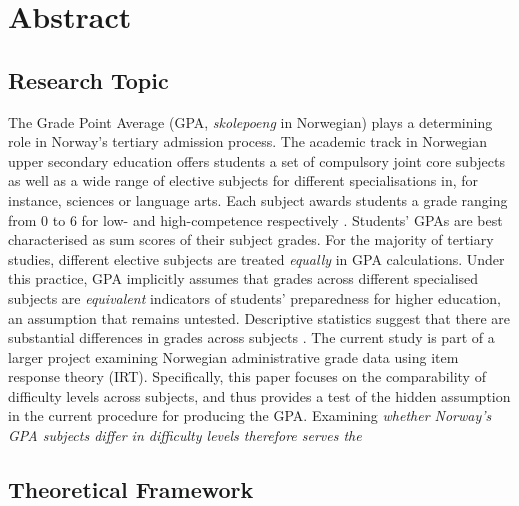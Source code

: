 \section{Abstract}


\subsection{Research Topic}

The Grade Point Average (GPA, \textit{skolepoeng} in Norwegian) plays a determining role in Norway's tertiary admission process. The academic track in Norwegian upper secondary education offers students a set of compulsory joint core subjects as well as a wide range of elective subjects for different specialisations in, for instance, sciences or language arts. Each subject awards students a grade ranging from $0$ to $6$ for low- and high-competence respectively \parencite[][\S 3-5]{lovdata:2006}. Students' GPAs are best characterised as sum scores of their subject grades. For the majority of tertiary studies, different elective subjects are treated \emph{equally} in GPA calculations. Under this practice, GPA implicitly assumes that grades across different specialised subjects are \emph{equivalent} indicators of students' preparedness for higher education, an assumption that remains untested. Descriptive statistics suggest that there are substantial differences in grades across subjects \parencite{udir:2022}. The current study is part of a larger project examining Norwegian administrative grade data using item response theory (IRT). Specifically, this paper focuses on the comparability of difficulty levels across subjects, and thus provides a test of the hidden assumption in the current procedure for producing the GPA. Examining \textit{whether Norway's GPA subjects differ in difficulty levels therefore serves the}

\subsection{Theoretical Framework}

